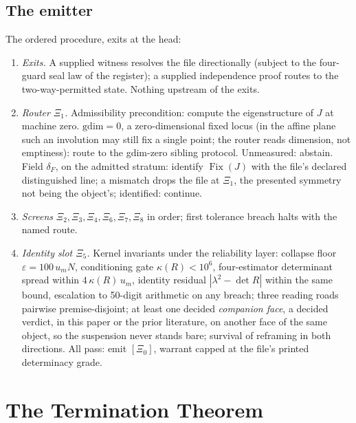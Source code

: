 \documentclass[twocolumn,10pt]{article}
\theoremstyle{plain}
\theoremstyle{definition}
\newcommand{\tXi}{[\Xi_0]}
\begin{document}
\subsection{The emitter}\label{ssec:emitter}
The ordered procedure, exits at the head:
\begin{enumerate}\itemsep1pt
\item[0.] \emph{Exits.} A supplied witness resolves the file directionally (subject to the four-guard seal law of the register); a supplied independence proof routes to the two-way-permitted state. Nothing upstream of the exits.
\item[1.] \emph{Router $\Xi_1$.} Admissibility precondition: compute the eigenstructure of $J$ at machine zero. $\mathrm{gdim}=0$, a zero-dimensional fixed locus (in the affine plane such an involution may still fix a single point; the router reads dimension, not emptiness): route to the gdim-zero sibling protocol. Unmeasured: abstain. Field $\delta_F$, on the admitted stratum: identify $\operatorname{Fix}(J)$ with the file's declared distinguished line; a mismatch drops the file at $\Xi_1$, the presented symmetry not being the object's; identified: continue.
\item[2.] \emph{Screens} $\Xi_2,\Xi_3,\Xi_4,\Xi_6,\Xi_7,\Xi_8$ in order; first tolerance breach halts with the named route.
\item[3.] \emph{Identity slot $\Xi_5$.} Kernel invariants under the reliability layer: collapse floor $\varepsilon=100\,u_m N$, conditioning gate $\kappa(R)<10^6$, four-estimator determinant spread within $4\,\kappa(R)\,u_m$, identity residual $|\lambda^2-\det R|$ within the same bound, escalation to 50-digit arithmetic on any breach; three reading roads pairwise premise-disjoint; at least one decided \emph{companion face}, a decided verdict, in this paper or the prior literature, on another face of the same object, so the suspension never stands bare; survival of reframing in both directions. All pass: emit $\tXi$, warrant capped at the file's printed determinacy grade.
\end{enumerate}

\section{The Termination Theorem}\label{sec:term}
\end{document}
